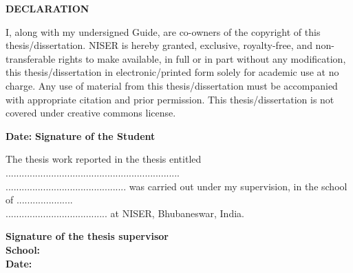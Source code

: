 \begin{center}
{\bf DECLARATION}
\end{center}

I, along with my undersigned Guide, are co-owners of the copyright of this thesis/dissertation. NISER is hereby granted, exclusive, royalty-free, and non-transferable rights to make available, in full or in part without any modification, this thesis/dissertation in electronic/printed form solely for academic use at no charge. Any use of material from this thesis/dissertation must be accompanied with appropriate citation and prior permission. This thesis/dissertation is not covered under creative commons license. 

\vskip1.0in
\hspace*{0.01in} {\textbf{Date:}}
\hspace*{3.2in} {\textbf{Signature of the Student}} \\


\vskip1.0in
\vskip1.0in

The thesis work reported in the thesis entitled .................................................................\\
............................................. was carried out under my supervision, in the school of .....................\\...................................... at NISER, Bhubaneswar, India.



\vskip1.0in

\hspace*{3in} {\textbf{Signature of the thesis supervisor}} \\
\hspace*{3in} {\textbf{School:}}\\
\hspace*{3in} {\textbf{Date:}}